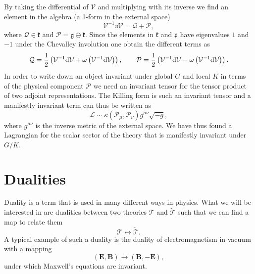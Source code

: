 By taking the differential of $\mathcal{V}$ and multiplying with its inverse we find an element in the algebra (a 1-form in the external space)
\begin{equation}
    \mathcal{V}^{-1}\dd \mathcal{V} = \mathcal{Q}+\mathcal{P},
\end{equation}
where $\mathcal{Q}\in\mathfrak{k}$ and $\mathcal{P}=\mathfrak{g}\ominus\mathfrak{k}$. Since the elements in $\mathfrak{k}$ and $\mathfrak{p}$ have eigenvalues $1$ and $-1$ under the Chevalley involution one obtain the different terms as
\begin{equation}
    \mathcal{Q} = \frac{1}{2}\left(\mathcal{V}^{-1}\mathrm{d} \mathcal{V}+\omega\left(\mathcal{V}^{-1}\mathrm{d} \mathcal{V}\right)\right),\\\qquad \mathcal{P} = \frac{1}{2}\left(\mathcal{V}^{-1}\mathrm{d} \mathcal{V}-\omega\left(\mathcal{V}^{-1}\mathrm{d} \mathcal{V}\right)\right).
\end{equation}
In order to write down an object invariant under global $G$ and local $K$ in terms of the physical component $\mathcal{P}$ we need an invariant tensor for the tensor product of two adjoint representations. The Killing form is such an invariant tensor and a manifestly invariant term can thus be written as 
\begin{equation}
    \mathcal{L} \sim \kappa(\mathcal{P}_\mu,\mathcal{P}_\nu)g^{\mu\nu}\sqrt{-g},
\end{equation}
where $g^{\mu\nu}$ is the inverse metric of the external space. We have thus found a Lagrangian for the scalar sector of the theory that is manifestly invariant under $G/K$. 


\section{Dualities}\label{sec:Dualities}
Duality is a term that is used in many different ways in physics. What we will be interested in are dualities between two theories $\mathscr{T}$ and $\tilde{\mathscr{T}}$ such that we can find a map to relate them 
\begin{equation}
    \mathscr{T} \leftrightarrow \mathscr{\tilde{T}}.
\end{equation}
A typical example of such a duality is the duality of electromagnetism in vacuum with a mapping 
\begin{equation}
    \left(\mathbf{E},\mathbf{B}\right) \to \left(\mathbf{B},-\mathbf{E}\right),
\end{equation}
under which Maxwell's equations are invariant. 

